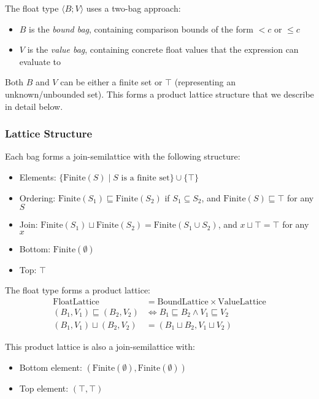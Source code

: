 \documentclass[acmsmall,screen,dvipsnames,x11names,nonacm,anonymous,review]{acmart}
\begin{document}
The float type \float$\langle B; V \rangle$ uses a two-bag approach:
\begin{itemize}
    \item $B$ is the \emph{bound bag}, containing comparison bounds of the form $< c$ or $\leq c$
    \item $V$ is the \emph{value bag}, containing concrete float values that the expression can evaluate to
\end{itemize}

Both $B$ and $V$ can be either a finite set or $\top$ (representing an unknown/unbounded set). This forms a product lattice structure that we describe in detail below.

\subsubsection{Lattice Structure}

Each bag forms a join-semilattice with the following structure:
\begin{itemize}
    \item Elements: $\{\text{Finite}(S) \mid S \text{ is a finite set}\} \cup \{\top\}$
    \item Ordering: $\text{Finite}(S_1) \sqsubseteq \text{Finite}(S_2)$ if $S_1 \subseteq S_2$, and $\text{Finite}(S) \sqsubseteq \top$ for any $S$
    \item Join: $\text{Finite}(S_1) \sqcup \text{Finite}(S_2) = \text{Finite}(S_1 \cup S_2)$, and $x \sqcup \top = \top$ for any $x$
    \item Bottom: $\text{Finite}(\emptyset)$
    \item Top: $\top$
\end{itemize}

The float type forms a product lattice:
\begin{align}
\text{FloatLattice} &= \text{BoundLattice} \times \text{ValueLattice} \\
(B_1, V_1) \sqsubseteq (B_2, V_2) &\iff B_1 \sqsubseteq B_2 \land V_1 \sqsubseteq V_2 \\
(B_1, V_1) \sqcup (B_2, V_2) &= (B_1 \sqcup B_2, V_1 \sqcup V_2)
\end{align}

This product lattice is also a join-semilattice with:
\begin{itemize}
    \item Bottom element: $(\text{Finite}(\emptyset), \text{Finite}(\emptyset))$
    \item Top element: $(\top, \top)$
\end{itemize}
\end{document}
